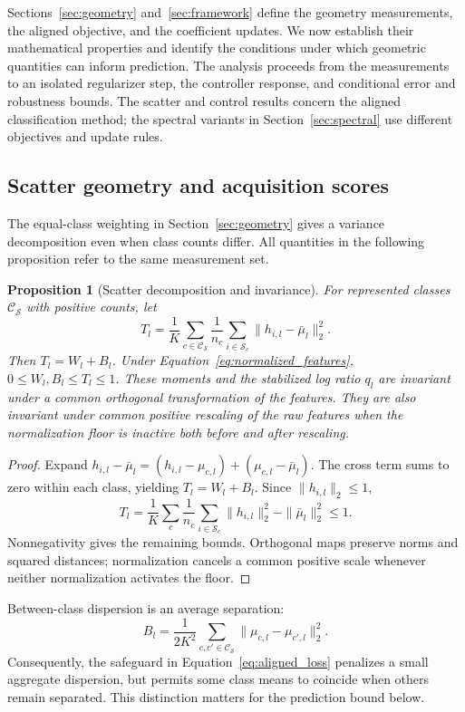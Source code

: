 \documentclass[10pt,a4paper,twocolumn]{article}
\newtheorem{proposition}{Proposition}
\begin{document}
Sections~\ref{sec:geometry} and~\ref{sec:framework} define the geometry
measurements, the aligned objective, and the coefficient updates.
We now establish their mathematical properties and identify the
conditions under which geometric quantities can inform prediction.
The analysis proceeds from the measurements to an isolated regularizer
step, the controller response, and conditional error and robustness
bounds. The scatter and control results concern the aligned
classification method; the spectral variants in
Section~\ref{sec:spectral} use different objectives and update rules.

\subsection{Scatter geometry and acquisition scores}
\label{sec:analysis_geometry}

The equal-class weighting in Section~\ref{sec:geometry} gives a
variance decomposition even when class counts differ. All quantities
in the following proposition refer to the same measurement set.

\begin{proposition}[Scatter decomposition and invariance]
\label{prop:scatter}
For represented classes $\mathcal C_{\mathcal S}$ with positive counts,
let
\[
 T_l=\frac1K\sum_{c\in\mathcal C_{\mathcal S}}\frac1{n_c}
       \sum_{i\in\mathcal S_c}\|h_{i,l}-\bar\mu_l\|_2^2.
\]
Then $T_l=W_l+B_l$. Under
Equation~\eqref{eq:normalized_features},
$0\le W_l,B_l\le T_l\le1$. These moments and the stabilized
log ratio $q_l$ are invariant under a common orthogonal transformation
of the features. They are also invariant under common positive
rescaling of the raw features when the normalization floor is inactive
both before and after rescaling.
\end{proposition}
\begin{proof}
Expand $h_{i,l}-\bar\mu_l=(h_{i,l}-\mu_{c,l})
+(\mu_{c,l}-\bar\mu_l)$. The cross term sums to zero within
each class, yielding $T_l=W_l+B_l$. Since $\|h_{i,l}\|_2\le1$,
\[
 T_l=\frac1K\sum_c\frac1{n_c}\sum_{i\in\mathcal S_c}
       \|h_{i,l}\|_2^2-\|\bar\mu_l\|_2^2\le1.
\]
Nonnegativity gives the remaining bounds. Orthogonal maps preserve
norms and squared distances; normalization cancels a common positive
scale whenever neither normalization activates the floor.
\end{proof}

Between-class dispersion is an average separation:
\[
 B_l=\frac1{2K^2}\sum_{c,c'\in\mathcal C_{\mathcal S}}
                    \|\mu_{c,l}-\mu_{c',l}\|_2^2.
\]
Consequently, the safeguard in Equation~\eqref{eq:aligned_loss}
penalizes a small aggregate dispersion, but permits some class means
to coincide when others remain separated. This distinction matters
for the prediction bound below.
\end{document}
